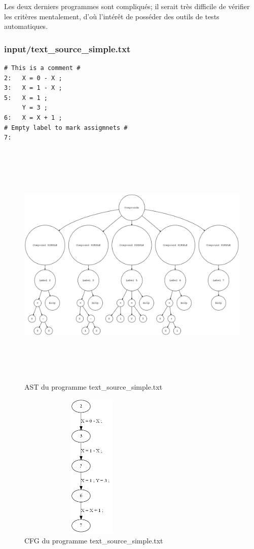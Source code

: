 \documentclass[a4paper]{article}
\begin{document}
Les deux derniers programmes sont compliqués; il serait très difficile de vérifier les critères mentalement, d'où l'intérêt de posséder des outils de tests automatiques.

\subsubsection{input/text\_source\_simple.txt}

\begin{verbatim}
# This is a comment #
2:   X = 0 - X ;
3:   X = 1 - X ;
5:   X = 1 ;
     Y = 3 ;
6:   X = X + 1 ;
# Empty label to mark assigmnets #
7:
\end{verbatim}

\begin{figure}[h!]
  \centering
  \includegraphics[width=12cm,height=12cm,keepaspectratio]{input/text_source_simple_ast.png}
  \caption{AST du programme text\_source\_simple.txt}
  \label{fig:ast1}
\end{figure}

\begin{figure}[h!]
  \centering
  \includegraphics[width=7cm,height=7cm,keepaspectratio]{input/text_source_simple_cfg.png}
  \caption{CFG du programme text\_source\_simple.txt}
  \label{fig:cfg1}
\end{figure}
\end{document}
